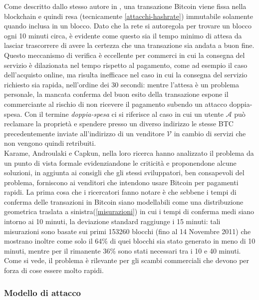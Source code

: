 Come descritto dallo stesso autore in \cite{bitcoin}, una transazione Bitcoin viene fissa nella blockchain e quindi resa (tecnicamente \ref{attacchi-hashrate}) immutabile solamente quando inclusa in un blocco. Dato che la rete si autoregola per trovare un blocco ogni 10 minuti circa, è evidente come questo sia il tempo minimo di attesa da lasciar trascorrere di avere la certezza che una transazione sia andata a buon fine. Questo meccanismo di verifica è eccellente per commerci in cui la consegna del servizio è dilazionata nel tempo rispetto al pagamento, come ad esempio il caso dell'acquisto online, ma risulta inefficace nel caso in cui la consegna del servizio richiesto sia rapida, nell'ordine dei 30 secondi: mentre l'attesa è un problema personale, la mancata conferma del buon esito della transazione espone il commerciante al rischio di non ricevere il pagamento subendo un attacco doppia-spesa. Con il termine \emph{doppia-spesa} ci si riferisce al caso in cui un utente $\mathcal{A}$ può reclamare la proprietà e spendere presso un diverso indirizzo le stesse BTC precedentemente inviate all'indirizzo di un venditore $\mathcal{V}$ in cambio di servizi che non vengono quindi retribuiti.\\
Karame, Androulaki e Capkun, nella loro ricerca \cite{doublespendig_fast} hanno analizzato il problema da un punto di vista formale evidenziandone le criticità e proponendone alcune soluzioni, in aggiunta ai consigli che gli stessi sviluppatori, ben consapevoli del problema, forniscono ai venditori che intendono usare Bitcoin per pagamenti rapidi.
La prima cosa che i ricercatori fanno notare è che sebbene i tempi di conferma delle transazioni in Bitcoin siano modellabili come una distribuzione geometrica traslata a sinistra(\ref{misurazioni}) in cui i tempi di conferma medi siano intorno ai 10 minuti, la deviazione standard raggiunge i 15 minuti: tali misurazioni sono basate sui primi 153260 blocchi (fino al 14 Novembre 2011) che mostrano inoltre come solo il 64\% di quei blocchi sia stato generato in meno di 10 minuti, mentre per il rimanente 36\% sono stati necessari tra i 10 e 40 minuti. Come si vede, il problema è rilevante per gli scambi commerciali che devono per forza di cose essere molto rapidi.

\subsubsection{Modello di attacco}

